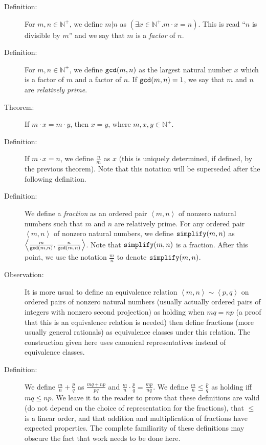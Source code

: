 \documentclass[12pt]{book}
\begin{document}
\begin{description}

\item[Definition:] For $m,n \in {\mathbb N}^+$, we define $m|n$ as
$(\exists x \in {\mathbb N}^+.m\cdot x = n)$.  This is read ``$n$ is
divisible by $m$'' and we say that $m$ is a {\em factor\/} of $n$.

\item[Definition:] For $m,n \in {\mathbb N}^+$, we define ${\tt
gcd}(m,n)$ as the largest natural number $x$ which is a factor of $m$
and a factor of $n$.  If ${\tt gcd}(m,n)=1$, we say that $m$ and $n$
are {\em relatively prime\/}.

\item[Theorem:] If $m\cdot x = m\cdot y$, then $x=y$, where $m,x,y \in
{\mathbb N}^+$.

\item[Definition:] If $m\cdot x = n$, we define $\frac nm$ as $x$
(this is uniquely determined, if defined, by the previous theorem).
Note that this notation will be superseded after the following
definition.

\item[Definition:] We define a {\em fraction\/} as an ordered pair
$\left<m,n\right>$ of nonzero natural numbers such that $m$ and $n$
are relatively prime.  For any ordered pair $\left<m,n\right>$ of
nonzero natural numbers, we define ${\tt simplify}(m,n)$ as
$\left<\frac m{{\tt gcd}(m,n)},\frac n{{\tt gcd}(m,n)}\right>$.  Note
that ${\tt simplify}(m,n)$ is a fraction.  After this point, we use
the notation $\frac mn$ to denote ${\tt simplify}(m,n)$.

\item[Observation:] It is more usual to define an equivalence relation
$\left<m,n\right> \sim \left<p,q\right>$ on ordered pairs of nonzero
natural numbers (usually actually ordered pairs of integers with
nonzero second projection) as holding when $mq=np$ (a proof that this
is an equivalence relation is needed) then define fractions (more
usually general rationals) as equivalence classes under this relation.
The construction given here uses canonical representatives instead of
equivalence classes.

\item[Definition:] We define $\frac mn + \frac pq$ as $\frac
{mq+np}{pq}$ and $\frac mn \cdot \frac pq = \frac{mp}{nq}$.  We define
$\frac mn \leq \frac pq$ as holding iff $mq \leq np$.  We leave it to
the reader to prove that these definitions are valid (do not depend on
the choice of representation for the fractions), that $\leq$ is a
linear order, and that addition and multiplication of fractions have
expected properties.  The complete familiarity of these definitions
may obscure the fact that work needs to be done here.

\end{description}
\end{document}
